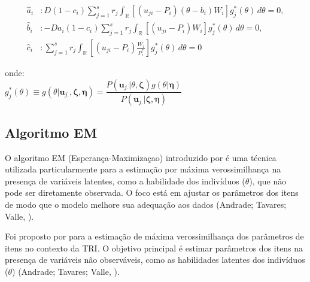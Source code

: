 \[
\begin{aligned}
	\hat{a}_i & : D(1 - c_i) \sum_{j=1}^{s} r_j
	\int_{\mathbb{R}} \left[(u_{ji} - P_i)(\theta - b_i)W_i\right] g_j^*(\theta) \, d\theta = 0, \\[1em]	
	\hat{b}_i & : -D a_i (1 - c_i) \sum_{j=1}^{s} r_j
	\int_{\mathbb{R}} \left[(u_{ji} - P_i)W_i \right] g_j^*(\theta) \, d\theta = 0, \\[1em]	
	\hat{c}_i & : \sum_{j=1}^{s} r_j \int_{\mathbb{R}}
	\left[(u_{ji} - P_i)\frac{W_i}{P^*_i}\right]
	g_j^*(\theta) \, d\theta = 0
\end{aligned}
\]

onde:\\ 

\(
g^*_j(\theta) \equiv
g(\theta|\boldsymbol{u}_{j.}, \boldsymbol{\zeta}, \boldsymbol{\eta}) =
\dfrac{
	P(\boldsymbol{u}_{j.}|\theta,\boldsymbol{\zeta})g(\theta|\boldsymbol{\eta})
}{
	P(\boldsymbol{u}_{j.}|\boldsymbol{\zeta}, \boldsymbol{\eta})
}
\)



\subsection{Algoritmo EM}


O algoritmo EM (Esperança-Maximizaçao) introduzido por  é uma técnica utilizada particularmente para a estimação por máxima verossimilhança na presença de variáveis latentes, como a habilidade dos indivíduos ($\theta$), que não pode ser diretamente observada.  O foco está em ajustar os parâmetros dos itens de modo que o modelo melhore sua adequação aos dados (Andrade; Tavares; Valle, \citeyear{de2000teoria}).

Foi proposto por  para a estimação de máxima verossimilhança dos parâmetros de itens no contexto da TRI. O objetivo principal é estimar parâmetros dos itens na presença de variáveis não observáveis, como as habilidades latentes dos indivíduos ($\theta$) (Andrade; Tavares; Valle, \citeyear{de2000teoria}).


